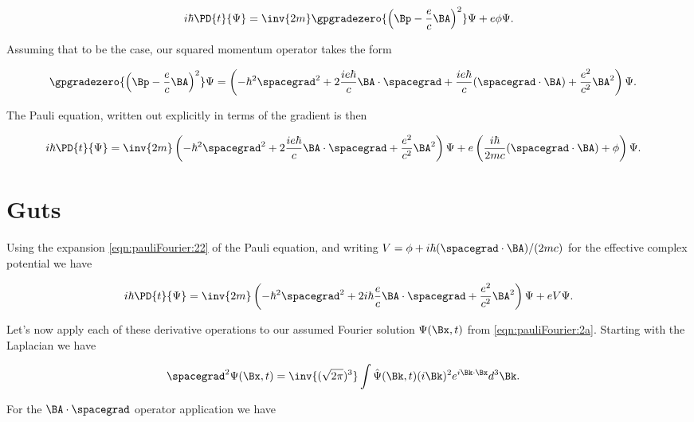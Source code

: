 \begin{align}\label{eqn:pauliFourier:1c}
i \hbar \PD{t}{\Psi} = \inv{2m} \gpgradezero{ \left( \Bp - \frac{e}{c} \BA \right)^2 } \Psi + e \phi \Psi.
\end{align}

Assuming that to be the case, our squared momentum operator takes the form

\begin{align}\label{eqn:pauliFourier:21}
\gpgradezero{ \left( \Bp - \frac{e}{c} \BA \right)^2 } \Psi 
&=
\left( - \hbar^2 \spacegrad^2 + 2 
\frac{i e \hbar }{c}
\BA \cdot \spacegrad 
+ 
\frac{i e \hbar }{c}
(\spacegrad \cdot \BA) 
+ 
\frac{e^2}{c^2} \BA^2 \right) \Psi.
\end{align}

The Pauli equation, written out explicitly in terms of the gradient is then

\begin{align}\label{eqn:pauliFourier:22}
i \hbar \PD{t}{\Psi} 
&= 
\inv{2m} 
\left( - \hbar^2 \spacegrad^2 + 2 
\frac{i e \hbar }{c}
\BA \cdot \spacegrad 
+ 
\frac{e^2}{c^2} \BA^2 \right) \Psi
+
e \left( \frac{i \hbar }{ 2 m c} (\spacegrad \cdot \BA) + \phi \right) \Psi.
\end{align}

\section{Guts}

Using the expansion \ref{eqn:pauliFourier:22} of the Pauli equation, and writing $V = \phi + i \hbar (\spacegrad \cdot \BA)/ (2 m c)$ for the effective complex potential we have

\begin{align}\label{eqn:pauliFourier:3}
i \hbar \PD{t}{\Psi} = \inv{2m} \left( - \hbar^2 \spacegrad^2 + 2 i \hbar \frac{e}{c} \BA \cdot \spacegrad + \frac{e^2}{c^2} \BA^2 \right) \Psi + e V \Psi.
\end{align}

Let's now apply each of these derivative operations to our assumed Fourier solution $\Psi(\Bx, t)$ from \ref{eqn:pauliFourier:2a}.  Starting with the Laplacian we have

\begin{align}\label{eqn:pauliFourier:xx1}
\spacegrad^2 \Psi(\Bx, t) &=
\inv{(\sqrt{2 \pi})^3} \int \hat{\Psi}(\Bk, t) (i\Bk)^2 e^{i \Bk \cdot \Bx} d^3 \Bk.
\end{align}

For the $\BA \cdot \spacegrad$ operator application we have

